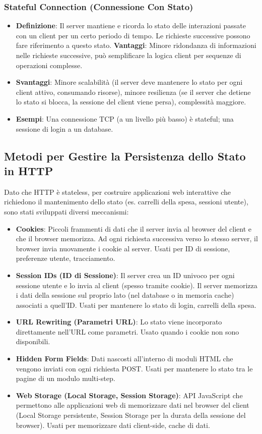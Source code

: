 \subsubsection{Stateful Connection (Connessione Con Stato)}
\begin{itemize}
    \item \textbf{Definizione}: Il server mantiene e ricorda lo stato delle interazioni passate con un client per un certo periodo di tempo. Le richieste successive possono fare riferimento a questo stato.
    \textbf{Vantaggi}: Minore ridondanza di informazioni nelle richieste successive, può semplificare la logica client per sequenze di operazioni complesse.
    \item \textbf{Svantaggi}: Minore scalabilità (il server deve mantenere lo stato per ogni client attivo, consumando risorse), minore resilienza (se il server che detiene lo stato si blocca, la sessione del client viene persa), complessità maggiore.
    \item \textbf{Esempi}: Una connessione TCP (a un livello più basso) è stateful; una sessione di login a un database.
\end{itemize}

\subsection{Metodi per Gestire la Persistenza dello Stato in HTTP}
Dato che HTTP è stateless, per costruire applicazioni web interattive che richiedono il mantenimento dello stato (es. carrelli della spesa, sessioni utente), sono stati sviluppati diversi meccanismi:
\begin{itemize}
    \item \textbf{Cookies}: Piccoli frammenti di dati che il server invia al browser del client e che il browser memorizza. Ad ogni richiesta successiva verso lo stesso server, il browser invia nuovamente i cookie al server. Usati per ID di sessione, preferenze utente, tracciamento.
    \item \textbf{Session IDs (ID di Sessione)}: Il server crea un ID univoco per ogni sessione utente e lo invia al client (spesso tramite cookie). Il server memorizza i dati della sessione sul proprio lato (nel database o in memoria cache) associati a quell'ID. Usati per mantenere lo stato di login, carrelli della spesa.
    \item \textbf{URL Rewriting (Parametri URL)}: Lo stato viene incorporato direttamente nell'URL come parametri. Usato quando i cookie non sono disponibili.
    \item \textbf{Hidden Form Fields}: Dati nascosti all'interno di moduli HTML che vengono inviati con ogni richiesta POST. Usati per mantenere lo stato tra le pagine di un modulo multi-step.
    \item \textbf{Web Storage (Local Storage, Session Storage)}: API JavaScript che permettono alle applicazioni web di memorizzare dati nel browser del client (Local Storage persistente, Session Storage per la durata della sessione del browser). Usati per memorizzare dati client-side, cache di dati.
\end{itemize}

